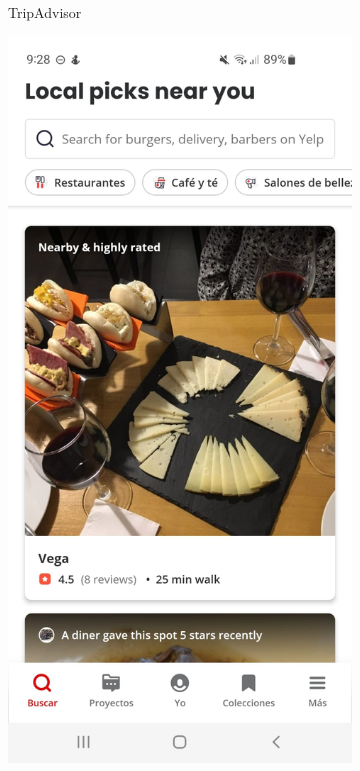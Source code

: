 \begin{figure}[H]
\begin{subfigure}{.3\textwidth}
        \caption{TripAdvisor}
        \label{fig:img4}
    \end{subfigure}%
    \hfill
    \begin{subfigure}{.3\textwidth}
        \centering
        \includegraphics[width=\linewidth]{imagenes/Yelp1.jpeg}

\end{subfigure}
\end{figure}
